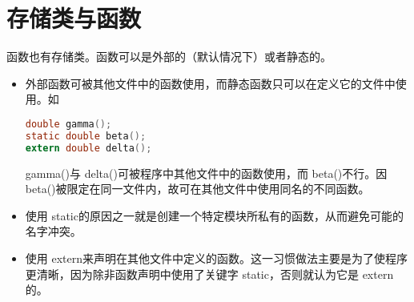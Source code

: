 \section{存储类与函数}

\begin{frame}[fragile]
  函数也有存储类。函数可以是外部的（默认情况下）或者静态的。

  \begin{itemize}
  \item 外部函数可被其他文件中的函数使用，而静态函数只可以在定义它的文件中使用。如
    \begin{lstlisting}[language=c,frame=single]
double gamma();
static double beta();
extern double delta();
\end{lstlisting}
{ gamma()}与{ delta()}可被程序中其他文件中的函数使用，而{ beta()}不行。因{ beta()}被限定在同一文件内，故可在其他文件中使用同名的不同函数。
\end{itemize}
\end{frame}

\begin{frame}[fragile]
  \begin{itemize}
  \item 使用{ static}的原因之一就是创建一个特定模块所私有的函数，从而避免可能的名字冲突。\\[0.1in]
  \item 使用{ extern}来声明在其他文件中定义的函数。这一习惯做法主要是为了使程序更清晰，因为除非函数声明中使用了关键字{ static}，否则就认为它是{ extern}的。
  \end{itemize}
\end{frame}